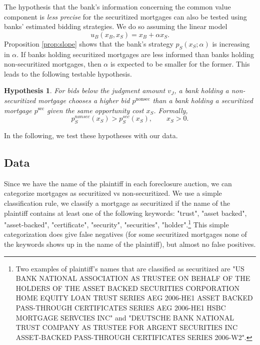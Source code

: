 \documentclass[11pt,twopage]{article}
\newtheorem{conjecture}{Hypothesis}
{\bf}{\it}
\begin{document}
The hypothesis that the bank's information concerning the common value component is \emph{less precise} for the securitized mortgages can also be tested using banks' estimated bidding strategies. We do so assuming the linear model 
\[
u_B(x_B,x_S) = x_B+\alpha x_S .
\] 
Proposition \ref{prop:slope} shows that the bank's strategy $p_S(x_S;\alpha)$ is increasing in $\alpha$. 
If banks holding securitized mortgages are less informed than banks holding non-securitized mortgages, then $\alpha$ is expected to be smaller for the former. This leads to the following testable hypothesis.
%


\begin{conjecture}\label{hyp:slope}
	For bids below the judgment amount $v_J$, a bank holding a non-securitized mortgage chooses a higher bid $p^\text{nonsec}$ than a bank holding a securitized mortgage $p^\text{sec}$ given the same opportunity cost $x_S$. Formally, \[ p_S^{nonsec}(x_S) > p_S^{sec}(x_S), \quad\quad x_S>0 .\] \end{conjecture}

In the following, we test these hypotheses with our data.

%

\subsection{Data}

Since we have the name of the plaintiff in each foreclosure auction,
we can categorize mortgages as securitized vs non-securitized. We use
a simple classification rule, we classify a mortgage as securitized if
the name of the plaintiff contains at least one of the following
keywords: "trust", "asset backed", "asset-backed",
"certificate", "security", "securities", "holder".\footnote{Two examples of plaintiff's names that are classified as securitized are "US BANK NATIONAL ASSOCIATION AS TRUSTEE ON BEHALF OF THE HOLDERS OF THE ASSET BACKED SECURITIES CORPORATION HOME EQUITY LOAN TRUST SERIES AEG 2006-HE1 ASSET BACKED PASS-THROUGH CERTIFICATES SERIES AEG 2006-HE1
	HSBC MORTGAGE SERVCIES INC" and "DEUTSCHE BANK NATIONAL TRUST COMPANY AS TRUSTEE FOR ARGENT SECURITIES INC ASSET-BACKED PASS-THROUGH CERTIFICATES SERIES 2006-W2".} This simple
categorization does give false negatives (for some securitized
mortgages none of the keywords shows up in the name of the plaintiff),
but almost no false positives.
\end{document}
